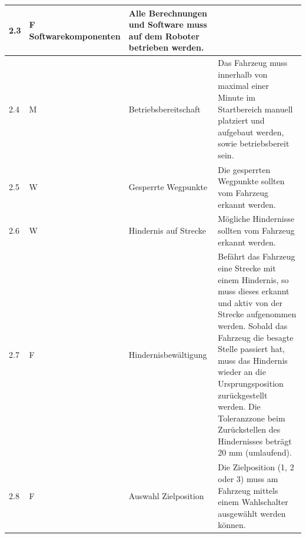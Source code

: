 \documentclass[../main.tex]{subfiles}
\begin{document}
\begin{tabular}{|l|p{0.5cm}|p{4cm}|p{10cm}|}
  \hline
  2.3          & F Softwarekomponenten & Alle Berechnungen und Software muss auf dem Roboter betrieben werden.                                                                                                                                                                                                                                                                                                                                              \\
  \hline
  2.4          & M                     & Betriebsbereitschaft                                                  & Das Fahrzeug muss innerhalb von maximal einer Minute im Startbereich manuell platziert und aufgebaut werden, sowie betriebsbereit sein.                                                                                                                                                                                                    \\
  \hline
  2.5          & W                     & Gesperrte Wegpunkte                                                   & Die gesperrten Wegpunkte sollten vom Fahrzeug erkannt werden.                                                                                                                                                                                                                                                                              \\
  \hline
  2.6          & W                     & Hindernis auf Strecke                                                 & Mögliche Hindernisse sollten vom Fahrzeug erkannt werden.                                                                                                                                                                                                                                                                                  \\
  \hline
  2.7          & F                     & Hindernisbewältigung                                                  & Befährt das Fahrzeug eine Strecke mit einem Hindernis, so muss dieses erkannt und aktiv von der Strecke aufgenommen werden. Sobald das Fahrzeug die besagte Stelle passiert hat, muss das Hindernis wieder an die Ursprungsposition zurückgestellt werden. Die Toleranzzone beim Zurückstellen des Hindernisses beträgt 20 mm (umlaufend). \\
  \hline
  2.8          & F                     & Auswahl Zielposition                                                  & Die Zielposition (1, 2 oder 3) muss am Fahrzeug mittels einem Wahlschalter ausgewählt werden können.                                                                                                                                                                                                                                       \\

\end{tabular}
\end{document}
